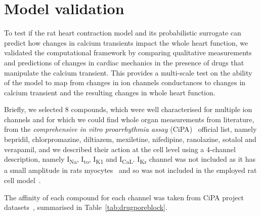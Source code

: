 %
%
%
\section{Model validation}\label{sec:ch6modelvalidation}
To test if the rat heart contraction model and its probabilistic surrogate can predict how changes in calcium transients impact the whole heart function, we validated the computational framework by comparing qualitative measurements and predictions of changes in cardiac mechanics in the presence of drugs that manipulate the calcium transient. This provides a multi-scale test on the ability of the model to map from changes in ion channels conductances to changes in calcium transient and the resulting changes in whole heart function.

\vspace{0.2cm}
Briefly, we selected $8$ compounds, which were well characterised for multiple ion channels and for which we could find whole organ measurements from literature, from the \textit{comprehensive in vitro proarrhythmia assay} (\acs{CiPA})~\cite{Park:2019} official list, namely bepridil, chlorpromazine, diltiazem, mexiletine, nifedipine, ranolazine, sotalol and verapamil, and we described their action at the cell level using a 4-channel description, namely I\textsubscript{Na}, I\textsubscript{to}, I\textsubscript{K1} and I\textsubscript{CaL}. I\textsubscript{Kr} channel was not included as it has a small amplitude in rats myocytes~\cite{Wymore:1997} and so was not included in the employed rat cell model~\cite{Gattoni:2017}.

\vspace{0.2cm}
The affinity of each compound for each channel was taken from CiPA project datasets~\cite{Li:2018, Li:2019}, summarised in Table~\ref{tab:drugporeblock}.

